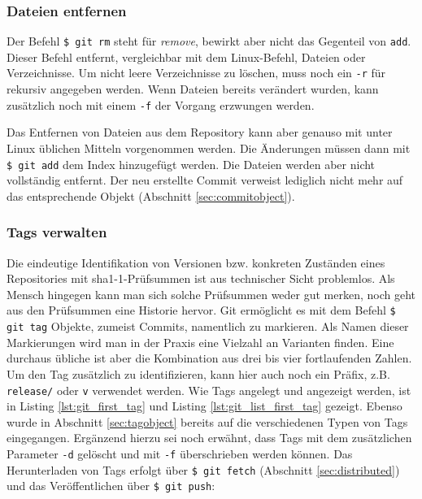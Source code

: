 
\subsubsection{Dateien entfernen}
Der Befehl \texttt{\$ git rm} steht für \textit{remove}, bewirkt aber nicht das
Gegenteil von \texttt{add}. Dieser Befehl entfernt, vergleichbar mit dem
Linux-Befehl, Dateien oder Verzeichnisse. Um nicht leere Verzeichnisse zu
löschen, muss noch ein \texttt{-r} für rekursiv angegeben werden. Wenn Dateien
bereits verändert wurden, kann zusätzlich noch mit einem \texttt{-f} der
Vorgang erzwungen werden.


Das Entfernen von Dateien aus dem Repository kann aber genauso mit unter Linux
üblichen Mitteln vorgenommen werden. Die Änderungen müssen dann mit \texttt{\$
git add} dem Index hinzugefügt werden. Die Dateien werden aber nicht
vollständig entfernt. Der neu erstellte Commit verweist lediglich nicht mehr
auf das entsprechende Objekt (Abschnitt \ref{sec:commitobject}).
\cite[S.~43-44]{gitosp}

\subsubsection{Tags verwalten}\label{sec:managetags}
Die eindeutige Identifikation von Versionen bzw. konkreten Zuständen eines
Repositories mit \acrshort{sha1}-1-Prüfsummen ist aus technischer Sicht problemlos.
Als Mensch hingegen kann man sich solche Prüfsummen weder gut merken, noch geht
aus den Prüfsummen eine Historie hervor. Git ermöglicht es mit dem Befehl
\texttt{\$ git tag} Objekte, zumeist Commits, namentlich zu markieren. Als
Namen dieser Markierungen wird man in der Praxis eine Vielzahl an Varianten
finden. Eine durchaus übliche ist aber die Kombination aus drei bis vier
fortlaufenden Zahlen. Um den Tag zusätzlich zu identifizieren, kann hier auch
noch ein Präfix, z.B. \texttt{release/} oder \texttt{v} verwendet werden. Wie
Tags angelegt und angezeigt werden, ist in Listing \ref{lst:git_first_tag} und
Listing \ref{lst:git_list_first_tag} gezeigt.  Ebenso wurde in Abschnitt
\ref{sec:tagobject} bereits auf die verschiedenen Typen von Tags eingegangen.
Ergänzend hierzu sei noch erwähnt, dass Tags mit dem zusätzlichen Parameter
\texttt{-d} gelöscht und mit \texttt{-f} überschrieben werden können. Das
Herunterladen von Tags erfolgt über \texttt{\$ git fetch} (Abschnitt
\ref{sec:distributed}) und das Veröffentlichen über \texttt{\$ git push}:

